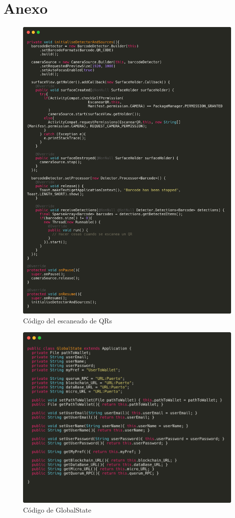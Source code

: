 \chapter{Anexo}
\label{cap:Anexo}

\begin{figure}[h!]
  \centering
  \includegraphics[width=1\linewidth]{figs/Anexo/zxing}
  \caption[Código del escaneado de QRs]{Código del escaneado de QRs}
  \label{fig:escaneandoQRs}
\end{figure}

\begin{figure}[h!]
  \centering
  \includegraphics[width=1\linewidth]{figs/Anexo/gs}
  \caption[Código de GlobalState]{Código de GlobalState}
  \label{fig:gs}
\end{figure}


